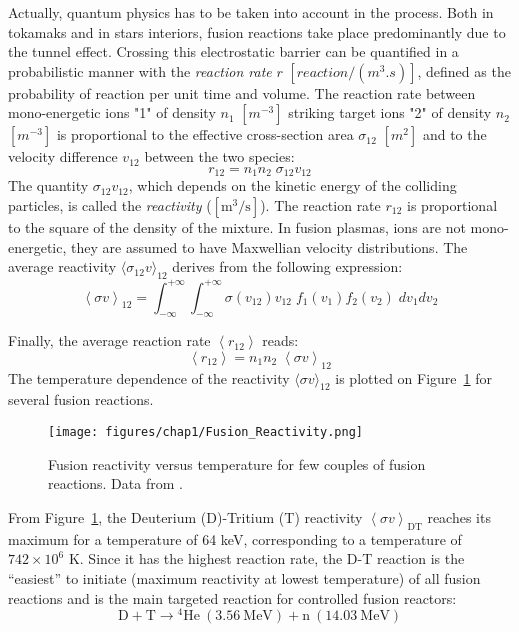 Actually, quantum physics has to be taken into account in the process. Both in tokamaks and in stars interiors, fusion reactions take place predominantly due to the tunnel effect. Crossing this electrostatic barrier can be quantified in a probabilistic manner with the \textit{reaction rate} $r$ $[\si{reaction/(m^3.s)}]$, defined as the probability of reaction per unit time and volume. 
The reaction rate between mono-energetic ions "1" of density $n_1$ $[\si{m}^{-3}]$ striking target ions "2" of density $n_2$ $[\si{m}^{-3}]$ is proportional to the effective cross-section area $\sigma_{12}$ $[\si{m}^2]$ and to the velocity difference $v_{12}$ between the two species:
\begin{equation*}
	r_{12} = n_1 n_2 \; \sigma_{12} v_{12}
\end{equation*}
The quantity  $\sigma_{12} v_{12}$, which depends on the kinetic energy of the colliding particles, is called the \textit{reactivity} ($\mathrm{[m^3/s]}$). The reaction rate $r_{12}$ is proportional to the square of the density of the mixture. In fusion plasmas, ions are not mono-energetic, they are assumed to have Maxwellian velocity distributions. The average reactivity $\langle \sigma_{12} v \rangle_{12}$ derives from the following expression:
\begin{equation*}
	\left < \sigma v \right >_{12} 
	= \int_{-\infty}^{+\infty} \int_{-\infty}^{+\infty} 
	\sigma(v_{12}) v_{12}\;  f_1(v_1) f_2(v_2) \; dv_1dv_2
\end{equation*}

Finally, the average reaction rate $\left < r_{12} \right >$ reads:
\begin{equation*}
	\left < r_{12} \right > = n_1 n_2 \; \left < \sigma v \right >_{12}
\end{equation*}
The temperature dependence of the reactivity $\langle \sigma v \rangle_{12}$ is plotted on Figure~\ref{fig:chap1:reactivity} for several fusion reactions.

\begin{figure} 
	\begin{center}
		\texttt{[image: figures/chap1/Fusion\_Reactivity.png]}
		\caption{Fusion reactivity versus temperature for few couples of fusion reactions. Data from .}
		\label{fig:chap1:reactivity}
	\end{center}
\end{figure}

From Figure~\ref{fig:chap1:reactivity}, the Deuterium (D)-Tritium (T) reactivity $\left<\sigma v\right>_{\mathrm{DT}}$ reaches its maximum for a temperature of 64 keV, corresponding to a temperature of $742\times10^6$ K. Since it has the highest reaction rate, the D-T reaction is the “easiest” to initiate (maximum reactivity at lowest temperature) of all fusion reactions and is the main targeted reaction for controlled fusion reactors: 
\begin{equation}
	\mathrm{D + T} \longrightarrow \mathrm{{}^4 He~(3.56~MeV) + n~(14.03~MeV)}
\end{equation}


